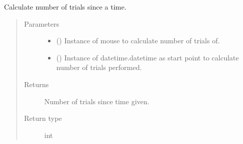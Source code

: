 \documentclass[letterpaper,10pt,english]{sphinxmanual}
\begin{document}
\begin{fulllineitems}
\label{\detokenize{NoSeMazeController/Analysis:Analysis.Analysis.n_trials_since}}
\pysigstartsignatures
{}
\pysigstopsignatures
\sphinxAtStartPar
Calculate number of trials since a time.
\begin{quote}\begin{description}
\item[{Parameters}] \leavevmode\begin{itemize}
\item {} 
\sphinxAtStartPar
{} () \textendash{} Instance of mouse to calculate number of trials of.

\item {} 
\sphinxAtStartPar
{} () \textendash{} Instance of datetime.datetime as start point to calculate number of
trials performed.

\end{itemize}

\item[{Returns}] \leavevmode
\sphinxAtStartPar
{} \textendash{} Number of trials since time given.

\item[{Return type}] \leavevmode
\sphinxAtStartPar
int

\end{description}\end{quote}

\end{fulllineitems}

\end{document}
